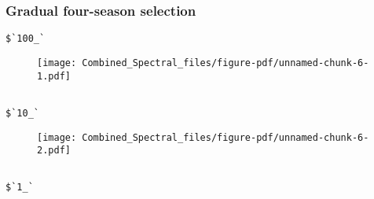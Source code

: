 \documentclass[
  letterpaper,
  DIV=11,
  numbers=noendperiod]{scrartcl}
\newenvironment{Shaded}{\begin{snugshade}}{\end{snugshade}}
\newcommand{\FunctionTok}[1]{\textcolor[rgb]{0.28,0.35,0.67}{#1}}
\newcommand{\NormalTok}[1]{\textcolor[rgb]{0.00,0.23,0.31}{#1}}
\newcommand{\OtherTok}[1]{\textcolor[rgb]{0.00,0.23,0.31}{#1}}
\newcommand{\SpecialCharTok}[1]{\textcolor[rgb]{0.37,0.37,0.37}{#1}}
\newcommand{\StringTok}[1]{\textcolor[rgb]{0.13,0.47,0.30}{#1}}
\begin{document}
\hypertarget{gradual-four-season-selection}{%
\subsubsection{Gradual four-season
selection}\label{gradual-four-season-selection}}

\begin{Shaded}
\end{Shaded}

\begin{verbatim}
$`100_`
\end{verbatim}

\begin{figure}[H]

{\centering \texttt{[image: Combined\_Spectral\_files/figure-pdf/unnamed-chunk-6-1.pdf]}

}

\end{figure}

\begin{verbatim}

$`10_`
\end{verbatim}

\begin{figure}[H]

{\centering \texttt{[image: Combined\_Spectral\_files/figure-pdf/unnamed-chunk-6-2.pdf]}

}

\end{figure}

\begin{verbatim}

$`1_`
\end{verbatim}
\end{document}
